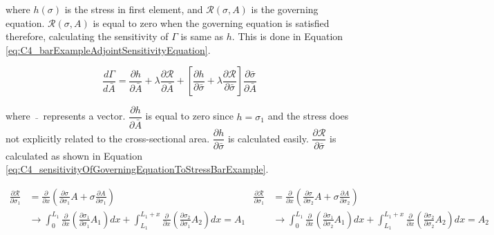 where $h(\sigma)$ is the stress in first element, and $\mathcal{R}(\sigma, A)$ is the governing equation. $\mathcal{R}(\sigma, A)$ is equal to zero when the governing equation is satisfied therefore, calculating the sensitivity of $\Gamma$ is same as $h$. This is done in Equation \eqref{eq:C4_barExampleAdjointSensitivityEquation}.

\begin{equation}\label{eq:C4_barExampleAdjointSensitivityEquation}
    \frac{d\Gamma}{d \bar{A}} = 
    \frac{\partial h}{\partial \bar{A}} + \lambda \frac{\partial \mathcal{R}}{\partial \bar{A}} + 
    \left[
    \frac{\partial h}{\partial \bar{\sigma}} + \lambda \frac{\partial \mathcal{R}}{\partial \bar{\sigma}}
    \right]
    \frac{\partial \bar{\sigma}}{\partial \bar{A}}
\end{equation}

where $\bar{\text{ }}$ represents a vector. $\dfrac{\partial h}{\partial \bar{A}}$ is equal to zero since $h = \sigma_1$ and the stress does not explicitly related to the cross-sectional area. $\dfrac{\partial h}{\partial \bar{\sigma}}$ is calculated easily. $\dfrac{\partial \mathcal{R}}{\partial \bar{\sigma}}$ is calculated as shown in Equation \eqref{eq:C4_sensitivityOfGoverningEquationToStressBarExample}.

\begin{subequations}\label{eq:C4_sensitivityOfGoverningEquationToStressBarExample}
\begin{align}
    \frac{\partial \mathcal{R}}{\partial \sigma_1} &= 
    \frac{\partial }{\partial x}
    \left(
    \frac{\partial \sigma}{\partial \sigma_1} A + \sigma \frac{\partial A}{\partial \sigma_1}
    \right) \nonumber \\
    &\rightarrow
    \int_0^{L_1}
    \frac{\partial}{\partial x}
    \left(
    \frac{\partial \sigma_1}{\partial \sigma_1} A_1
    \right) dx + 
    \int_{L_1}^{L_1 + x}
    \frac{\partial}{\partial x}
    \left(
    \frac{\partial \sigma_2}{\partial \sigma_1} A_2
    \right) dx = A_1
\end{align}
\begin{align}
    \frac{\partial \mathcal{R}}{\partial \sigma_1} &= 
    \frac{\partial }{\partial x}
    \left(
    \frac{\partial \sigma}{\partial \sigma_2} A + \sigma \frac{\partial A}{\partial \sigma_2}
    \right) \nonumber \\
    &\rightarrow
    \int_0^{L_1}
    \frac{\partial}{\partial x}
    \left(
    \frac{\partial \sigma_1}{\partial \sigma_2} A_1
    \right) dx + 
    \int_{L_1}^{L_1 + x}
    \frac{\partial}{\partial x}
    \left(
    \frac{\partial \sigma_2}{\partial \sigma_2} A_2
    \right) dx = A_2
\end{align}
\end{subequations}

